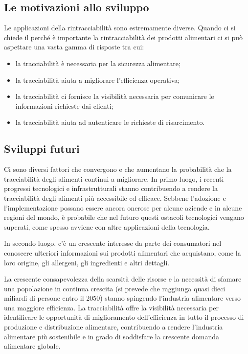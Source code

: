 \subsection{Le motivazioni allo sviluppo}

Le applicazioni della rintracciabilità sono estremamente diverse. Quando ci si chiede il perché è importante la rintracciabilità dei prodotti alimentari ci si può aspettare una vasta gamma di risposte tra cui:

\begin{itemize}
    \item la tracciabilità è necessaria per la sicurezza alimentare;
    \item la tracciabilità aiuta a migliorare l'efficienza operativa;
    \item la tracciabilità ci fornisce la visibilità necessaria per comunicare le informazioni richieste dai clienti;
    \item la tracciabilità aiuta ad autenticare le richieste di risarcimento.
    
\end{itemize}

\subsection{Sviluppi futuri}

Ci sono diversi fattori che convergono e che aumentano la probabilità che la tracciabilità degli alimenti continui a migliorare. In primo luogo, i recenti progressi tecnologici e infrastrutturali stanno contribuendo a rendere la tracciabilità degli alimenti più accessibile ed efficace. Sebbene l'adozione e l'implementazione possano essere ancora onerose per alcune aziende e in alcune regioni del mondo, è probabile che nel futuro questi ostacoli tecnologici vengano superati, come spesso avviene con altre applicazioni della tecnologia.

In secondo luogo, c'è un crescente interesse da parte dei consumatori nel conoscere ulteriori informazioni sui prodotti alimentari che acquistano, come la loro origine, gli allergeni, gli ingredienti e altri dettagli.

La crescente consapevolezza della scarsità delle risorse e la necessità di sfamare una popolazione in continua crescita (si prevede che raggiunga quasi dieci miliardi di persone entro il 2050) stanno spingendo l'industria alimentare verso una maggiore efficienza. La tracciabilità offre la visibilità necessaria per identificare le opportunità di miglioramento dell'efficienza in tutto il processo di produzione e distribuzione alimentare, contribuendo a rendere l'industria alimentare più sostenibile e in grado di soddisfare la crescente domanda alimentare globale.

